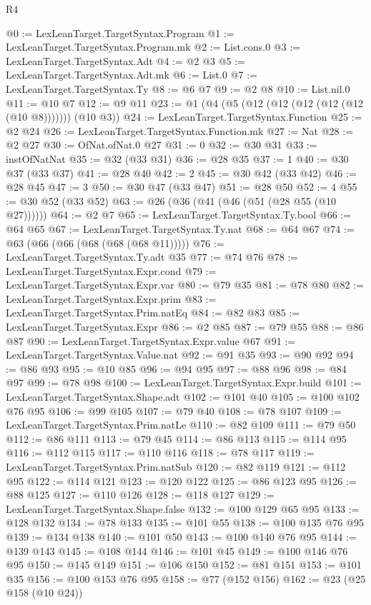\begin{lexlean}{R4}
\begin{coremodule}
@0 := LexLeanTarget.TargetSyntax.Program
@1 := LexLeanTarget.TargetSyntax.Program.mk
@2 := List.cons.{0}
@3 := LexLeanTarget.TargetSyntax.Adt
@4 := @2 @3
@5 := LexLeanTarget.TargetSyntax.Adt.mk
@6 := List.{0}
@7 := LexLeanTarget.TargetSyntax.Ty
@8 := @6 @7
@9 := @2 @8
@10 := List.nil.{0}
@11 := @10 @7
@12 := @9 @11
@23 := @1 (@4 (@5 (@12 (@12 (@12 (@12 (@12 (@10 @8))))))) (@10 @3))
@24 := LexLeanTarget.TargetSyntax.Function
@25 := @2 @24
@26 := LexLeanTarget.TargetSyntax.Function.mk
@27 := Nat
@28 := @2 @27
@30 := OfNat.ofNat.{0} @27
@31 := 0
@32 := @30 @31
@33 := instOfNatNat
@35 := @32 (@33 @31)
@36 := @28 @35
@37 := 1
@40 := @30 @37 (@33 @37)
@41 := @28 @40
@42 := 2
@45 := @30 @42 (@33 @42)
@46 := @28 @45
@47 := 3
@50 := @30 @47 (@33 @47)
@51 := @28 @50
@52 := 4
@55 := @30 @52 (@33 @52)
@63 := @26 (@36 (@41 (@46 (@51 (@28 @55 (@10 @27))))))
@64 := @2 @7
@65 := LexLeanTarget.TargetSyntax.Ty.bool
@66 := @64 @65
@67 := LexLeanTarget.TargetSyntax.Ty.nat
@68 := @64 @67
@74 := @63 (@66 (@66 (@68 (@68 (@68 @11)))))
@76 := LexLeanTarget.TargetSyntax.Ty.adt @35
@77 := @74 @76
@78 := LexLeanTarget.TargetSyntax.Expr.cond
@79 := LexLeanTarget.TargetSyntax.Expr.var
@80 := @79 @35
@81 := @78 @80
@82 := LexLeanTarget.TargetSyntax.Expr.prim
@83 := LexLeanTarget.TargetSyntax.Prim.natEq
@84 := @82 @83
@85 := LexLeanTarget.TargetSyntax.Expr
@86 := @2 @85
@87 := @79 @55
@88 := @86 @87
@90 := LexLeanTarget.TargetSyntax.Expr.value @67
@91 := LexLeanTarget.TargetSyntax.Value.nat
@92 := @91 @35
@93 := @90 @92
@94 := @86 @93
@95 := @10 @85
@96 := @94 @95
@97 := @88 @96
@98 := @84 @97
@99 := @78 @98
@100 := LexLeanTarget.TargetSyntax.Expr.build
@101 := LexLeanTarget.TargetSyntax.Shape.adt
@102 := @101 @40
@105 := @100 @102 @76 @95
@106 := @99 @105
@107 := @79 @40
@108 := @78 @107
@109 := LexLeanTarget.TargetSyntax.Prim.natLe
@110 := @82 @109
@111 := @79 @50
@112 := @86 @111
@113 := @79 @45
@114 := @86 @113
@115 := @114 @95
@116 := @112 @115
@117 := @110 @116
@118 := @78 @117
@119 := LexLeanTarget.TargetSyntax.Prim.natSub
@120 := @82 @119
@121 := @112 @95
@122 := @114 @121
@123 := @120 @122
@125 := @86 @123 @95
@126 := @88 @125
@127 := @110 @126
@128 := @118 @127
@129 := LexLeanTarget.TargetSyntax.Shape.false
@132 := @100 @129 @65 @95
@133 := @128 @132
@134 := @78 @133
@135 := @101 @55
@138 := @100 @135 @76 @95
@139 := @134 @138
@140 := @101 @50
@143 := @100 @140 @76 @95
@144 := @139 @143
@145 := @108 @144
@146 := @101 @45
@149 := @100 @146 @76 @95
@150 := @145 @149
@151 := @106 @150
@152 := @81 @151
@153 := @101 @35
@156 := @100 @153 @76 @95
@158 := @77 (@152 @156)
@162 := @23 (@25 @158 (@10 @24))

\end{coremodule}
\end{lexlean}
